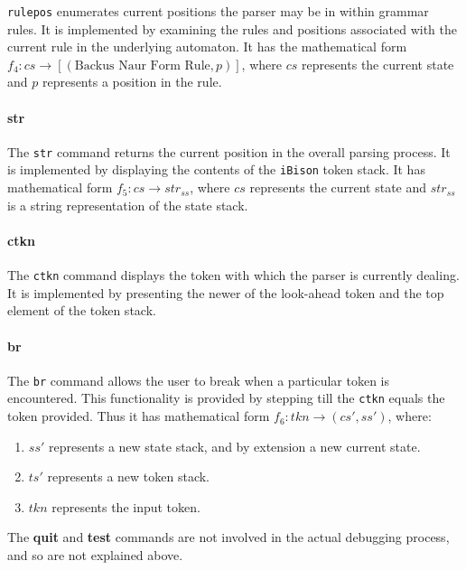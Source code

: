 \verb|rulepos| enumerates current positions the parser may be in within grammar rules. It is implemented by examining the rules
and positions associated with the current rule in the underlying automaton. It has the mathematical form $f_4: cs \rightarrow [(\mbox{Backus Naur Form Rule},  p)]$, where $cs$ represents the current state and $p$ represents a position in the rule.

\paragraph{str}

The \verb|str| command returns the current position in the overall parsing process. It is implemented by displaying the contents of the \verb|iBison| token stack. It has mathematical form $f_5: cs \rightarrow str_{ss}$, where $cs$ represents the current state and $str_{ss}$ is a string representation of the state stack.

\paragraph{ctkn}

The \verb|ctkn| command displays the token with which the parser is currently dealing. It is implemented by presenting the newer of the look-ahead token and the top element of the token stack.


\paragraph{br}

The \verb|br| command allows the user to break when a particular token is encountered. This functionality is provided by stepping till the \verb|ctkn| equals the token provided. Thus it has mathematical form $f_6 : tkn \rightarrow (cs', ss')$, where:

\begin{enumerate}
\item $ss'$ represents a new state stack, and by extension a new current state.
\item $ts'$ represents a new token stack.
\item $tkn$ represents the input token.
\end{enumerate}


The \textbf{quit} and \textbf{test} commands are not involved in the actual debugging process, and so are not explained above.
